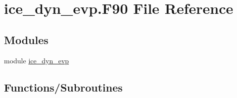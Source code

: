 \hypertarget{ice__dyn__evp_8F90}{
\section{ice\_\-dyn\_\-evp.F90 File Reference}
\label{ice__dyn__evp_8F90}
}
\subsection*{Modules}
\begin{DoxyCompactItemize}
\item 
module \hyperlink{namespaceice__dyn__evp}{ice\_\-dyn\_\-evp}
\end{DoxyCompactItemize}
\subsection*{Functions/Subroutines}
